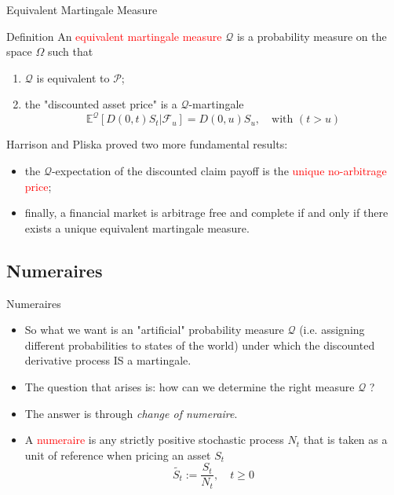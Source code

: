 \documentclass{beamer}
\begin{document}
\begin{frame}{Equivalent Martingale Measure}
	\begin{block}{Definition}
	An \textcolor{red}{equivalent martingale measure} $\mathcal{Q}$ is a probability measure on the space $\Omega$ such that
	\begin{enumerate}
		\item $\mathcal{Q}$ is equivalent to $\mathcal{P}$;
		\item the "discounted asset price" is a $\mathcal{Q}$-martingale
		\begin{equation}
			\mathbb{E}^\mathcal{Q}[D(0,t)S_t|\mathcal{F}_u] = D(0,u)S_u, \quad\text{with }(t>u)
		\end{equation}
	\end{enumerate}
	\end{block}
Harrison and Pliska proved two more fundamental results:
\begin{itemize}
	\item the $\mathcal{Q}$-expectation of the discounted claim payoff is the \textcolor{red}{unique no-arbitrage price};
	\item finally, a financial market is arbitrage free and complete if and only if there exists a unique equivalent martingale measure.
\end{itemize}
\end{frame}

\subsection{Numeraires}
\begin{frame}{Numeraires}
	\begin{itemize}
		\item So what we want is an "artificial" probability measure $\mathcal{Q}$ (i.e. assigning different probabilities to states of the world) under which the discounted derivative process IS a martingale.
		\item The question that arises is: how can we determine the right measure $\mathcal{Q}$ ?
		\item The answer is through \emph{change of numeraire}.
		\item A \textcolor{red}{numeraire} is any strictly positive stochastic process $N_t$ that is taken as a unit of reference when pricing an asset $S_t$
		\begin{equation*}
			\tilde{S_t}:=\frac{S_t}{N_t}, \quad t \ge 0
		\end{equation*}
	\end{itemize}
\end{frame}
\end{document}
